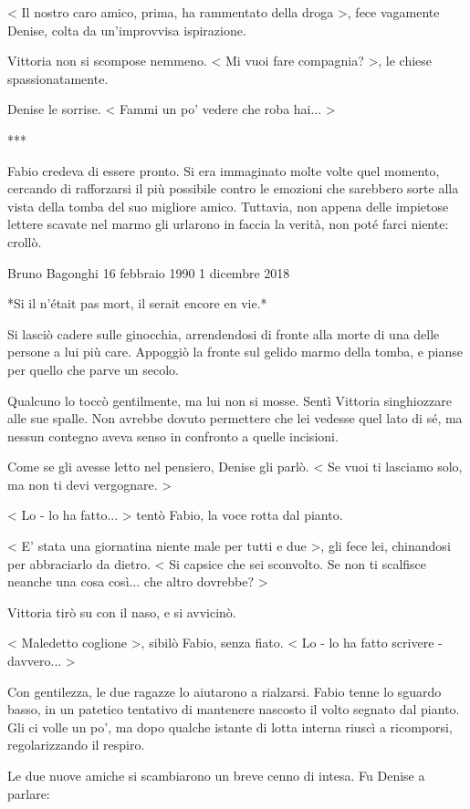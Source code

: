 < Il nostro caro amico, prima, ha rammentato della droga >, fece vagamente Denise, colta da un'improvvisa ispirazione.

Vittoria non si scompose nemmeno. < Mi vuoi fare compagnia? >, le chiese spassionatamente.

Denise le sorrise. < Fammi un po' vedere che roba hai... >

***

Fabio credeva di essere pronto. Si era immaginato molte volte quel momento, cercando di rafforzarsi il più possibile contro le emozioni che sarebbero sorte alla vista della tomba del suo migliore amico. Tuttavia, non appena delle impietose lettere scavate nel marmo gli urlarono in faccia la verità, non poté farci niente: crollò.

Bruno Bagonghi
16 febbraio 1990
1 dicembre 2018

*Si il n'était pas mort, il serait encore en vie.*

Si lasciò cadere sulle ginocchia, arrendendosi di fronte alla morte di una delle persone a lui più care. Appoggiò la fronte sul gelido marmo della tomba, e pianse per quello che parve un secolo.

Qualcuno lo toccò gentilmente, ma lui non si mosse. Sentì Vittoria singhiozzare alle sue spalle. Non avrebbe dovuto permettere che lei vedesse quel lato di sé, ma nessun contegno aveva senso in confronto a quelle incisioni.

Come se gli avesse letto nel pensiero, Denise gli parlò. < Se vuoi ti lasciamo solo, ma non ti devi vergognare. >

< Lo - lo ha fatto... > tentò Fabio, la voce rotta dal pianto.

< E' stata una giornatina niente male per tutti e due >, gli fece lei, chinandosi per abbraciarlo da dietro. < Si capsice che sei sconvolto. Se non ti scalfisce neanche una cosa così... che altro dovrebbe? >

Vittoria tirò su con il naso, e si avvicinò.

< Maledetto coglione >, sibilò Fabio, senza fiato. < Lo - lo ha fatto scrivere - davvero... >

Con gentilezza, le due ragazze lo aiutarono a rialzarsi. Fabio tenne lo sguardo basso, in un patetico tentativo di mantenere nascosto il volto segnato dal pianto. Gli ci volle un po', ma dopo qualche istante di lotta interna riuscì a ricomporsi, regolarizzando il respiro.

Le due nuove amiche si scambiarono un breve cenno di intesa. Fu Denise a parlare:

